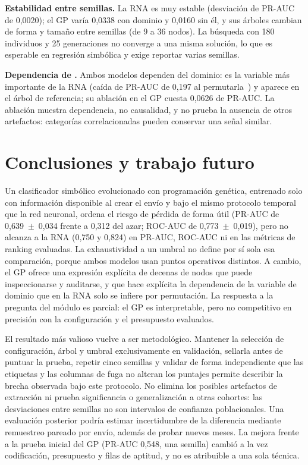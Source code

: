 \documentclass[conference]{IEEEtran}
\newcommand{\col}[1]{\texttt{\detokenize{#1}}}
\begin{document}
\textbf{Estabilidad entre semillas.} La RNA es muy estable (desviación de
PR-AUC de 0,0020); el GP varía 0,0338 con dominio y 0,0160 sin él, y sus
árboles cambian de forma y tamaño entre semillas (de 9 a 36 nodos). La
búsqueda con 180 individuos y 25 generaciones no converge a una misma
solución, lo que es esperable en regresión simbólica y exige reportar varias
semillas.

\textbf{Dependencia de \col{DOM_DOMAIN_ID}.} Ambos modelos dependen del
dominio: es la variable más importante de la RNA (caída de PR-AUC de 0,197 al
permutarla~\cite{informe_rna}) y aparece en el árbol de referencia;
su ablación en el GP cuesta 0,0626 de PR-AUC. La ablación muestra
dependencia, no causalidad, y no prueba la ausencia de otros artefactos:
categorías correlacionadas pueden conservar una señal similar.

\section{Conclusiones y trabajo futuro}

Un clasificador simbólico evolucionado con programación genética, entrenado
solo con información disponible al crear el envío y bajo el mismo protocolo
temporal que la red neuronal, ordena el riesgo de pérdida de forma útil
(PR-AUC de 0,639~$\pm$~0,034 frente a 0,312 del azar; ROC-AUC de
0,773~$\pm$~0,019), pero no alcanza a la RNA (0,750 y 0,824) en PR-AUC,
ROC-AUC ni en las métricas de ranking evaluadas. La exhaustividad a un umbral
no define por sí sola esa comparación, porque ambos modelos usan puntos
operativos distintos. A cambio, el GP ofrece una expresión explícita de
decenas de nodos que puede inspeccionarse y
auditarse, y que hace explícita la dependencia de la variable de dominio que
en la RNA solo se infiere por permutación. La respuesta a la pregunta del
módulo es parcial: el GP es interpretable, pero no competitivo en precisión
con la configuración y el presupuesto evaluados.

El resultado más valioso vuelve a ser metodológico. Mantener la selección de
configuración, árbol y umbral exclusivamente en validación, sellarla antes de
puntuar la prueba, repetir cinco semillas y validar de forma independiente que
las etiquetas y las columnas de fuga no alteran los puntajes permite
describir la brecha observada bajo este protocolo. No elimina los posibles
artefactos de extracción ni prueba significancia o generalización a otras
cohortes: las desviaciones entre semillas no son intervalos de confianza
poblacionales. Una evaluación posterior podría estimar incertidumbre de la
diferencia mediante remuestreo pareado por envío, además de probar nuevos
meses. La mejora
frente a la prueba inicial del GP (PR-AUC 0,548, una semilla) cambió a la vez
codificación, presupuesto y filas de aptitud, y no es atribuible a una sola
técnica.
\end{document}
